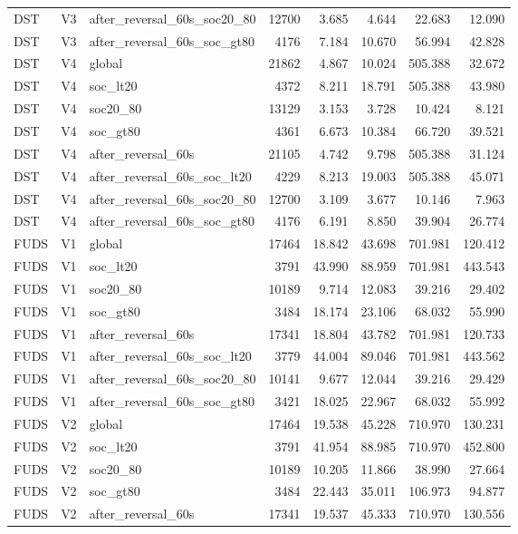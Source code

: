 \begin{tabular}{lllrrrrr}
DST & V3 & after\_reversal\_60s\_soc20\_80 & 12700 & 3.685 & 4.644 & 22.683 & 12.090 \\
DST & V3 & after\_reversal\_60s\_soc\_gt80 & 4176 & 7.184 & 10.670 & 56.994 & 42.828 \\
DST & V4 & global & 21862 & 4.867 & 10.024 & 505.388 & 32.672 \\
DST & V4 & soc\_lt20 & 4372 & 8.211 & 18.791 & 505.388 & 43.980 \\
DST & V4 & soc20\_80 & 13129 & 3.153 & 3.728 & 10.424 & 8.121 \\
DST & V4 & soc\_gt80 & 4361 & 6.673 & 10.384 & 66.720 & 39.521 \\
DST & V4 & after\_reversal\_60s & 21105 & 4.742 & 9.798 & 505.388 & 31.124 \\
DST & V4 & after\_reversal\_60s\_soc\_lt20 & 4229 & 8.213 & 19.003 & 505.388 & 45.071 \\
DST & V4 & after\_reversal\_60s\_soc20\_80 & 12700 & 3.109 & 3.677 & 10.146 & 7.963 \\
DST & V4 & after\_reversal\_60s\_soc\_gt80 & 4176 & 6.191 & 8.850 & 39.904 & 26.774 \\
FUDS & V1 & global & 17464 & 18.842 & 43.698 & 701.981 & 120.412 \\
FUDS & V1 & soc\_lt20 & 3791 & 43.990 & 88.959 & 701.981 & 443.543 \\
FUDS & V1 & soc20\_80 & 10189 & 9.714 & 12.083 & 39.216 & 29.402 \\
FUDS & V1 & soc\_gt80 & 3484 & 18.174 & 23.106 & 68.032 & 55.990 \\
FUDS & V1 & after\_reversal\_60s & 17341 & 18.804 & 43.782 & 701.981 & 120.733 \\
FUDS & V1 & after\_reversal\_60s\_soc\_lt20 & 3779 & 44.004 & 89.046 & 701.981 & 443.562 \\
FUDS & V1 & after\_reversal\_60s\_soc20\_80 & 10141 & 9.677 & 12.044 & 39.216 & 29.429 \\
FUDS & V1 & after\_reversal\_60s\_soc\_gt80 & 3421 & 18.025 & 22.967 & 68.032 & 55.992 \\
FUDS & V2 & global & 17464 & 19.538 & 45.228 & 710.970 & 130.231 \\
FUDS & V2 & soc\_lt20 & 3791 & 41.954 & 88.985 & 710.970 & 452.800 \\
FUDS & V2 & soc20\_80 & 10189 & 10.205 & 11.866 & 38.990 & 27.664 \\
FUDS & V2 & soc\_gt80 & 3484 & 22.443 & 35.011 & 106.973 & 94.877 \\
FUDS & V2 & after\_reversal\_60s & 17341 & 19.537 & 45.333 & 710.970 & 130.556 \\

\end{tabular}
